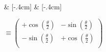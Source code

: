 \begin{quantikz}[row sep={0.6cm,between origins}, wire types={q}]
	 & [-.4cm]  & [-.4cm] \\
\end{quantikz} $ \equiv \begin{pmatrix}
		+\cos(\frac\theta2) & -\sin(\frac\theta2)  \\[.3cm]
		-\sin(\frac\theta2) & +\cos(\frac\theta2	) \\
	\end{pmatrix} $